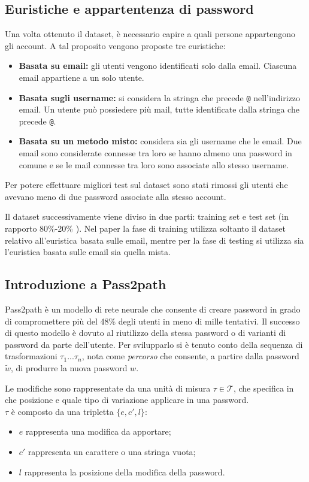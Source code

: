 \subsection{Euristiche e appartentenza di password}
\label{sec:euristiche e appartenenza di password}
Una volta ottenuto il dataset, è necessario capire a quali persone appartengono gli account. A tal proposito vengono proposte tre euristiche:
\begin{itemize}
    \item \textbf{Basata su email:} gli utenti vengono identificati solo dalla email. Ciascuna email appartiene a un solo utente.
    \item \textbf{Basata sugli username:} si considera la stringa che precede \texttt{@} nell'indirizzo email. Un utente può possiedere più mail, tutte identificate dalla stringa che precede \texttt{@}.
    \item \textbf{Basata su un metodo misto:} considera sia gli username che le email. Due email sono considerate connesse tra loro se hanno almeno una password in comune e se le mail connesse tra loro sono associate allo stesso username.
\end{itemize}
Per potere effettuare migliori test sul dataset sono stati rimossi gli utenti che avevano meno di due password associate alla stesso account.

Il dataset successivamente viene diviso in due parti: training set e test set (in rapporto 80\%-20\% ). Nel paper la fase di training utilizza soltanto il dataset relativo all'euristica basata sulle email, mentre per la fase di testing si utilizza sia l'euristica basata sulle email sia quella mista.

\subsection{Introduzione a Pass2path}
\label{sec:intro pass2path}
Pass2path è un modello di rete neurale che consente di creare password in grado di compromettere più del 48\% degli utenti in meno di mille tentativi. Il successo di questo modello è dovuto al riutilizzo della stessa password o di varianti di password da parte dell'utente.
Per svilupparlo si è tenuto conto della sequenza di trasformazioni $\tau_1...\tau_n $, nota come \emph{percorso} che consente, a partire dalla password  $\tilde{w}$, di produrre la nuova password $w$.


Le modifiche sono rappresentate da una unità di misura $\tau\in \mathcal{T}$, che specifica in che posizione e quale tipo di variazione applicare in una password.
\\
$\tau$ è composto da una tripletta  $\{e, c', l\}$:
\begin{itemize}
    \item $e$ rappresenta una modifica da apportare;
    \item $c'$ rappresenta un carattere o una stringa vuota;
    \item $l$ rappresenta la posizione della modifica della password.
\end{itemize}

